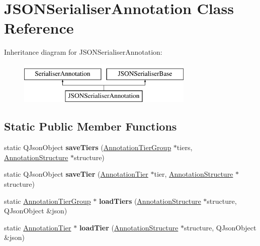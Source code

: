 \hypertarget{class_j_s_o_n_serialiser_annotation}{}\section{J\+S\+O\+N\+Serialiser\+Annotation Class Reference}
\label{class_j_s_o_n_serialiser_annotation}
Inheritance diagram for J\+S\+O\+N\+Serialiser\+Annotation\+:\begin{figure}[H]
\begin{center}
\leavevmode
\includegraphics[height=2.000000cm]{class_j_s_o_n_serialiser_annotation}
\end{center}
\end{figure}
\subsection*{Static Public Member Functions}
\begin{DoxyCompactItemize}
\item 
\mbox{\label{class_j_s_o_n_serialiser_annotation_abdb36f8d7c471f8991ff1107c7560ddb}} 
static Q\+Json\+Object {\bfseries save\+Tiers} (\hyperlink{class_annotation_tier_group}{Annotation\+Tier\+Group} $\ast$tiers, \hyperlink{class_annotation_structure}{Annotation\+Structure} $\ast$structure)
\item 
\mbox{\label{class_j_s_o_n_serialiser_annotation_a82dcd8bd3d69ce4af6a97814ad4161ed}} 
static Q\+Json\+Object {\bfseries save\+Tier} (\hyperlink{class_annotation_tier}{Annotation\+Tier} $\ast$tier, \hyperlink{class_annotation_structure}{Annotation\+Structure} $\ast$structure)
\item 
\mbox{\label{class_j_s_o_n_serialiser_annotation_acd81902e1da7e9e3106bba8dc975fe06}} 
static \hyperlink{class_annotation_tier_group}{Annotation\+Tier\+Group} $\ast$ {\bfseries load\+Tiers} (\hyperlink{class_annotation_structure}{Annotation\+Structure} $\ast$structure, Q\+Json\+Object \&json)
\item 
\mbox{\label{class_j_s_o_n_serialiser_annotation_a049be31eba293e48f6c47099509c70df}} 
static \hyperlink{class_annotation_tier}{Annotation\+Tier} $\ast$ {\bfseries load\+Tier} (\hyperlink{class_annotation_structure}{Annotation\+Structure} $\ast$structure, Q\+Json\+Object \&json)
\end{DoxyCompactItemize}
